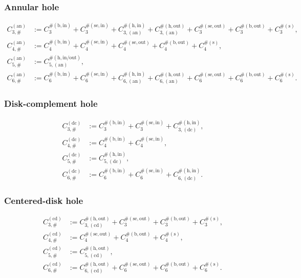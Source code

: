 \documentclass[a4paper]{article}
\numberwithin{equation}{section}
\begin{document}
\subsubsection{Annular hole}
\begin{align}
\label{def of C3sharp an}
C_{3,\#}^{(\mathrm{an})}&:=
C_3^{\#(\mathrm{b,in})}+C_3^{\#(\mathrm{se,in})}+C_{3,(\mathrm{an})}^{\#(\mathrm{h,in})}
+C_{3,(\mathrm{an})}^{\#(\mathrm{h,out})}+C_{3}^{\#(\mathrm{se,out})}+C_{3}^{\#(\mathrm{b,out})}+C_{3}^{\#(\mathrm{s})}, 
\\
\label{def of C4sharp an}
C_{4,\#}^{(\mathrm{an})}&:=
C_4^{\#(\mathrm{b,in})}+C_4^{\#(\mathrm{se,in})}+C_{4}^{\#(\mathrm{se,out})}+C_{4}^{\#(\mathrm{b,out})}+C_{4}^{\#(\mathrm{s})},
\\
\label{def of C5sharp an}
C_{5,\#}^{(\mathrm{an})}&:=C_{5,(\mathrm{an})}^{\#(\mathrm{h,in/out})}, 
\\
\label{def of C6sharp an}
C_{6,\#}^{(\mathrm{an})}&:=C_6^{\#(\mathrm{b,in})}+C_6^{\#(\mathrm{se,in})}+C_{6,(\mathrm{an})}^{\#(\mathrm{h,in})}+C_{6,(\mathrm{an})}^{\#(\mathrm{h,out})}+C_{6}^{\#(\mathrm{se,out})}+C_6^{\#(\mathrm{b,out})}+C_{6}^{\#(\mathrm{s})}.
\end{align}
\subsubsection{Disk-complement hole}
\begin{align}
\label{def of C3sharp dc}
C_{3,\#}^{(\mathrm{dc})}&:=
C_3^{\#(\mathrm{b,in})}+C_3^{\#(\mathrm{se,in})}+C_{3,(\mathrm{dc})}^{\#(\mathrm{h,in})}, 
\\
\label{def of C4sharp dc}
C_{4,\#}^{(\mathrm{dc})}
&:=
C_4^{\#(\mathrm{b,in})}
+
C_4^{\#(\mathrm{se,in})},
\\
\label{def of C5sharp dc}
C_{5,\#}^{(\mathrm{dc})}
&:=
C_{5,(\mathrm{dc})}^{\#(\mathrm{h,in})},
\\
\label{def of C6sharp dc}
C_{6,\#}^{(\mathrm{dc})}&:=
C_6^{\#(\mathrm{b,in})}+C_6^{\#(\mathrm{se,in})}+C_{6,(\mathrm{dc})}^{\#(\mathrm{h,in})}. 
\end{align}
\subsubsection{Centered-disk hole}
\begin{align}
\label{def of Csharp3 cd}
C_{3,\#}^{(\mathrm{cd})}&:=
C_{3,(\mathrm{cd})}^{\#(\mathrm{h,out})}+C_{3}^{\#(\mathrm{se,out})}+C_{3}^{\#(\mathrm{b,out})}+C_{3}^{\#(\mathrm{s})}, 
\\
\label{def of Csharp4 cd}
C_{4,\#}^{(\mathrm{cd})}&:=C_{4}^{\#(\mathrm{se,out})}+C_{4}^{\#(\mathrm{b,out})}+C_{4}^{\#(\mathrm{s})},
\\
\label{def of Csharp5 cd}
C_{5,\#}^{(\mathrm{cd})}&:=C_{5,(\mathrm{cd})}^{\#(\mathrm{h,out})}, 
\\
\label{def of Csharp6 cd}
C_{6,\#}^{(\mathrm{cd})}&:=C_{6,(\mathrm{cd})}^{\#(\mathrm{h,out})}+C_{6}^{\#(\mathrm{se,out})}+C_6^{\#(\mathrm{b,out})}+C_{6}^{\#(\mathrm{s})}. 
\end{align}
\end{document}
